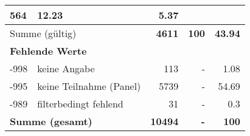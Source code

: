 \begin{longtable}{lXrrr}
       \num{564} &
       \num[round-mode=places,round-precision=2]{12,23} &
         \num[round-mode=places,round-precision=2]{5,37} \\
     \midrule
     \multicolumn{2}{l}{Summe (gültig)} &
       \textbf{\num{4611}} &
     \textbf{100} &
       \textbf{\num[round-mode=places,round-precision=2]{43,94}} \\
     \multicolumn{5}{l}{\textbf{Fehlende Werte}}\\
       -998 &
       keine Angabe &
         \num{113} &
        - &
         \num[round-mode=places,round-precision=2]{1,08} \\
       -995 &
       keine Teilnahme (Panel) &
         \num{5739} &
        - &
         \num[round-mode=places,round-precision=2]{54,69} \\
       -989 &
       filterbedingt fehlend &
         \num{31} &
        - &
         \num[round-mode=places,round-precision=2]{0,3} \\
     \midrule
     \multicolumn{2}{l}{\textbf{Summe (gesamt)}} &
          \textbf{\num{10494}} &
        \textbf{-} &
        \textbf{100} \\
     \bottomrule
     \end{longtable}
     
